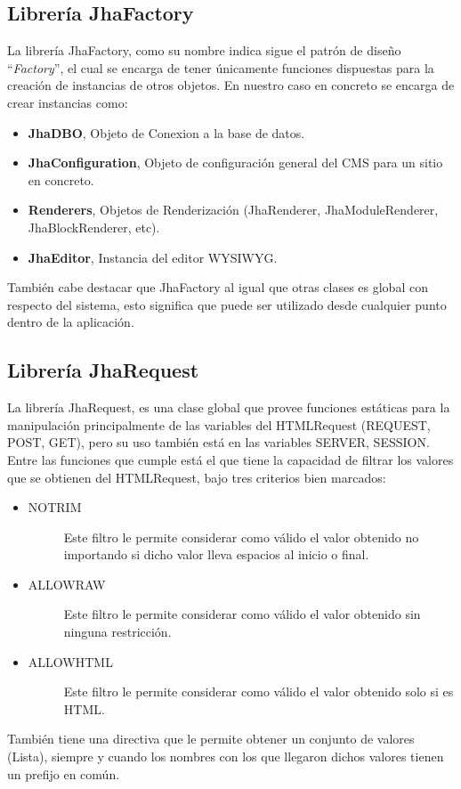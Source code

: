 \subsection{Librer\'ia JhaFactory}
La librer\'ia JhaFactory, como su nombre indica sigue el patr\'on de dise\~no ``\textit{Factory}'', el cual se encarga de tener \'unicamente funciones dispuestas para la creaci\'on de instancias de otros objetos. En nuestro caso en concreto se encarga de crear instancias como:
\begin{itemize}
\item \textbf{JhaDBO}, Objeto de Conexion a la base de datos.
\item \textbf{JhaConfiguration}, Objeto de configuraci\'on general del CMS para un sitio en concreto.
\item \textbf{Renderers}, Objetos de Renderizaci\'on (\textsf{JhaRenderer}, \textsf{JhaModuleRenderer}, \textsf{JhaBlockRenderer}, etc).
\item \textbf{JhaEditor}, Instancia del editor WYSIWYG.
\end{itemize}
Tambi\'en cabe destacar que JhaFactory al igual que otras clases es global con respecto del sistema, esto significa que puede ser utilizado desde cualquier punto dentro de la aplicaci\'on.

\subsection{Librer\'ia JhaRequest}
La librer\'ia JhaRequest, es una clase global que provee funciones est\'aticas para la manipulaci\'on principalmente de las variables del HTMLRequest (REQUEST, POST, GET), pero su uso tambi\'en est\'a en las variables SERVER, SESSION.\\
Entre las funciones que cumple est\'a el que tiene la capacidad de filtrar los valores que se obtienen del HTMLRequest, bajo tres criterios bien marcados:
\begin{itemize}
\item \begin{description}
	\item[NOTRIM] Este filtro le permite considerar como v\'alido el valor obtenido no importando si dicho valor lleva espacios al inicio o final.
	\end{description}
\item \begin{description}
	\item[ALLOWRAW] Este filtro le permite considerar como v\'alido el valor obtenido sin ninguna restricci\'on.
	\end{description}
\item \begin{description}
	\item[ALLOWHTML] Este filtro le permite considerar como v\'alido el valor obtenido solo si es HTML.
	\end{description}
\end{itemize}
Tambi\'en tiene una directiva que le permite obtener un conjunto de valores (Lista), siempre y cuando los nombres con los que llegaron dichos valores tienen un prefijo en com\'un.

